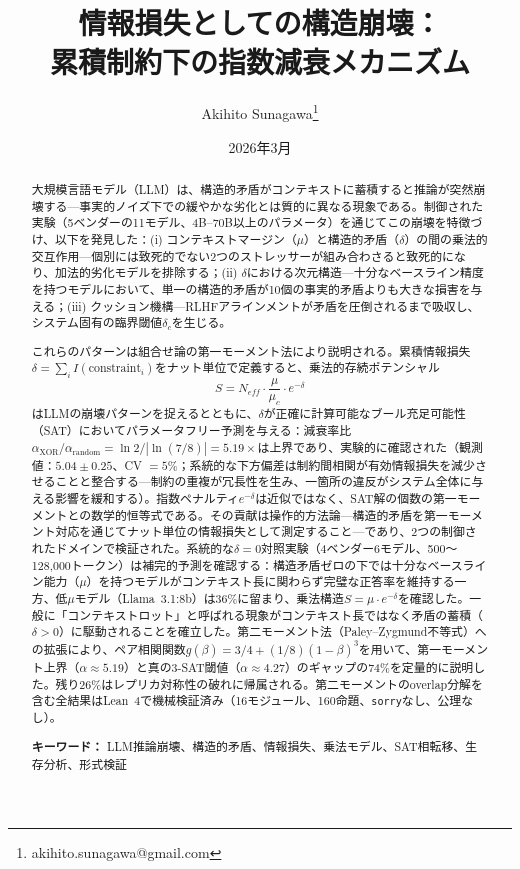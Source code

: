 \documentclass[11pt,a4paper]{article}
\title{情報損失としての構造崩壊：\\累積制約下の指数減衰メカニズム}
\author{Akihito Sunagawa\thanks{akihito.sunagawa@gmail.com}}
\date{2026年3月}
\begin{document}
\maketitle

\begin{abstract}
大規模言語モデル（LLM）は、構造的矛盾がコンテキストに蓄積すると推論が突然崩壊する---事実的ノイズ下での緩やかな劣化とは質的に異なる現象である。制御された実験（5ベンダーの11モデル、4B--70B以上のパラメータ）を通じてこの崩壊を特徴づけ、以下を発見した：(i) コンテキストマージン（$\mu$）と構造的矛盾（$\delta$）の間の乗法的交互作用---個別には致死的でない2つのストレッサーが組み合わさると致死的になり、加法的劣化モデルを排除する；(ii) $\delta$における次元構造---十分なベースライン精度を持つモデルにおいて、単一の構造的矛盾が10個の事実的矛盾よりも大きな損害を与える；(iii) クッション機構---RLHFアラインメントが矛盾を圧倒されるまで吸収し、システム固有の臨界閾値$\delta_c$を生じる。

これらのパターンは組合せ論の第一モーメント法により説明される。累積情報損失$\delta = \sum_i I(\text{constraint}_i)$をナット単位で定義すると、乗法的存続ポテンシャル
\[
S = N_{eff} \cdot \frac{\mu}{\mu_c} \cdot e^{-\delta}
\]
はLLMの崩壊パターンを捉えるとともに、$\delta$が正確に計算可能なブール充足可能性（SAT）においてパラメータフリー予測を与える：減衰率比$\alpha_{\text{XOR}}/\alpha_{\text{random}} = \ln 2 / |\ln(7/8)| = 5.19\times$は上界であり、実験的に確認された（観測値：$5.04 \pm 0.25$、CV $= 5\%$；系統的な下方偏差は制約間相関が有効情報損失を減少させることと整合する---制約の重複が冗長性を生み、一箇所の違反がシステム全体に与える影響を緩和する）。指数ペナルティ$e^{-\delta}$は近似ではなく、SAT解の個数の第一モーメントとの数学的恒等式である。その貢献は操作的方法論---構造的矛盾を第一モーメント対応を通じてナット単位の情報損失として測定すること---であり、2つの制御されたドメインで検証された。系統的な$\delta = 0$対照実験（4ベンダー6モデル、500〜128{,}000トークン）は補完的予測を確認する：構造矛盾ゼロの下では十分なベースライン能力（$\mu$）を持つモデルがコンテキスト長に関わらず完璧な正答率を維持する一方、低$\mu$モデル（Llama~3.1:8b）は36\%に留まり、乗法構造$S = \mu \cdot e^{-\delta}$を確認した。一般に「コンテキストロット」と呼ばれる現象がコンテキスト長ではなく矛盾の蓄積（$\delta > 0$）に駆動されることを確立した。第二モーメント法（Paley--Zygmund不等式）への拡張により、ペア相関関数$g(\beta) = 3/4 + (1/8)(1-\beta)^3$を用いて、第一モーメント上界（$\alpha \approx 5.19$）と真の3-SAT閾値（$\alpha \approx 4.27$）のギャップの74\%を定量的に説明した。残り26\%はレプリカ対称性の破れに帰属される。第二モーメントのoverlap分解を含む全結果はLean~4で機械検証済み（16モジュール、160命題、\texttt{sorry}なし、公理なし）。

\medskip
\noindent\textbf{キーワード：} LLM推論崩壊、構造的矛盾、情報損失、乗法モデル、SAT相転移、生存分析、形式検証
\end{abstract}
\end{document}
